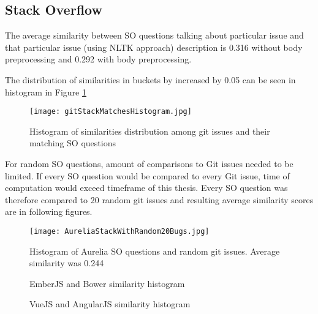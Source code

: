 \subsection{Stack Overflow}
The average similarity between SO questions talking about particular issue and that particular issue (using NLTK approach) description is 0.316 without body preprocessing and 0.292 with body preprocessing.

The distribution of similarities in buckets by increased by 0.05 can be seen in histogram in Figure \ref{fig:GitStackMatchesHistogram}

\begin{figure}[H]%
    \centering
	\texttt{[image: gitStackMatchesHistogram.jpg]}
    \caption{Histogram of similarities distribution among git issues and their matching SO questions}%
    \label{fig:GitStackMatchesHistogram}%
\end{figure}

For random SO questions, amount of comparisons to Git issues needed to be limited. If every SO question would be compared to every Git issue, time of computation would exceed timeframe of this thesis. Every SO question was therefore compared to 20 random git issues and resulting average similarity scores are in following figures.

\begin{figure}[H]%
    \centering
	\texttt{[image: AureliaStackWithRandom20Bugs.jpg]}
    \caption{Histogram of Aurelia SO questions and random git issues. Average similarity was 0.244}%
    \label{fig:AureliaStackWithRandom3Bugs}%
\end{figure}

\begin{figure}[H]%
    \centering
    \qquad
    \caption{EmberJS and Bower similarity histogram}%
    \label{fig:BowerEmberWithRandom3Bugs}%
\end{figure}

\begin{figure}[H]%
    \centering
    \qquad
    \caption{VueJS and AngularJS similarity histogram}%
    \label{fig:VueAngularWithRandom3Bugs}%
\end{figure}


